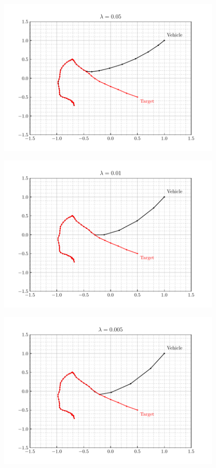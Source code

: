 \documentclass[12pt]{article}
\begin{document}
\begin{figure}[H]
    \centering
    \includegraphics{../../src/task_1/output/ex_1_i=6.pdf}
\end{figure}

\begin{figure}[H]
    \centering
    \includegraphics{../../src/task_1/output/ex_1_i=7.pdf}
\end{figure}

\begin{figure}[H]
    \centering
    \includegraphics{../../src/task_1/output/ex_1_i=8.pdf}
\end{figure}
\end{document}
